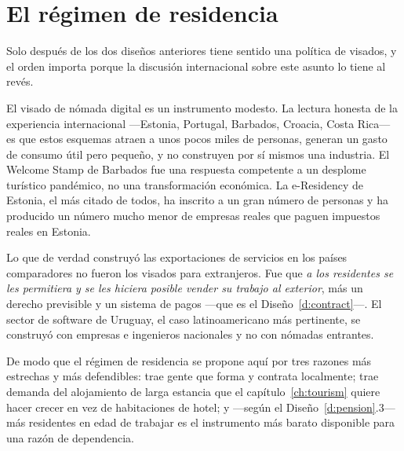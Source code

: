 \section{El régimen de residencia}

Solo después de los dos diseños anteriores tiene sentido una política de visados, y el orden
importa porque la discusión internacional sobre este asunto lo tiene al revés.

El visado de nómada digital es un instrumento modesto. La lectura honesta de la experiencia
internacional ---Estonia, Portugal, Barbados, Croacia, Costa Rica--- es que estos esquemas
atraen a unos pocos miles de personas, generan un gasto de consumo útil pero pequeño, y no
construyen por sí mismos una industria. El Welcome Stamp de Barbados fue una respuesta
competente a un desplome turístico pandémico, no una transformación económica. La
e-Residency de Estonia, el más citado de todos, ha inscrito a un gran número de personas y ha
producido un número mucho menor de empresas reales que paguen impuestos reales en Estonia.

Lo que de verdad construyó las exportaciones de servicios en los países comparadores no
fueron los visados para extranjeros. Fue que \emph{a los residentes se les permitiera y se
les hiciera posible vender su trabajo al exterior}, más un derecho previsible y un sistema
de pagos ---que es el Diseño~\ref{d:contract}---. El sector de software de Uruguay, el caso
latinoamericano más pertinente, se construyó con empresas e ingenieros nacionales y no con
nómadas entrantes.

De modo que el régimen de residencia se propone aquí por tres razones más estrechas y más
defendibles: trae gente que forma y contrata localmente; trae demanda del alojamiento de
larga estancia que el capítulo~\ref{ch:tourism} quiere hacer crecer en vez de habitaciones de
hotel; y ---según el Diseño~\ref{d:pension}.3--- más residentes en edad de trabajar es el
instrumento más barato disponible para una razón de dependencia.

